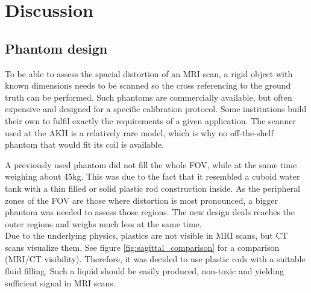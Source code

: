 


\chapter{Discussion}

\section{Phantom design}

To be able to assess the spacial distortion of an MRI scan, a rigid object with known dimensions needs to be scanned so the cross referencing to the ground truth can be performed.
Such phantoms are commercially available, but often expensive and designed for a specific calibration protocol.
Some institutions build their own to fulfil exactly the requirements of a given application.
The scanner used at the AKH is a relatively rare model, which is why no off-the-shelf phantom that would fit its coil is available.

A previously used phantom did not fill the whole FOV, while at the same time weighing about 45kg.
This was due to the fact that it resembled a cuboid water tank with a thin filled or solid plastic rod construction inside.
As the peripheral zones of the FOV are those where distortion is most pronounced, a bigger phantom was needed to assess those regions.
The new design deals reaches the outer regions and weighs much less at the same time.\\

Due to the underlying physics, plastics are not visible in MRI scans, but CT scans visualize them. 
See figure \ref{fig:sagittal_comparison} for a comparison (MRI/CT visibility).
Therefore, it was decided to use plastic rods with a suitable fluid filling.
Such a liquid should be easily produced, non-toxic and yielding sufficient signal in MRI scans.

